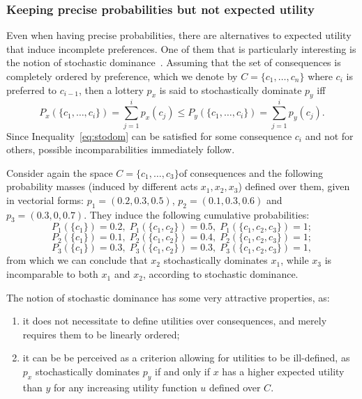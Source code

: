 \documentclass[french, english]{llncs}
\begin{document}
	\subsubsection{Keeping precise probabilities but not expected utility}
	
	Even when having precise probabilities, there are alternatives to expected utility that induce incomplete preferences. One of them that is particularly interesting is the notion of stochastic dominance~\cite{levy_stochastic_1992}. Assuming that the set of consequences is completely ordered by preference, which we denote by $C = \{c_1, …, c_n\}$ where $c_i$ is preferred to $c_{i - 1}$, then a lottery $p_x$ is said to stochastically dominate $p_y$ iff
	\begin{equation}\label{eq:stodom}P_x(\{c_1,\ldots,c_i\})=\sum_{j=1}^i p_x(c_j) \leq P_y(\{c_1,\ldots,c_i\})=\sum_{j=1}^i p_y(c_j).\end{equation}
	Since Inequality~\eqref{eq:stodom} can be satisfied for some consequence $c_i$ and not for others, possible incomparabilities immediately follow. %
	
	\begin{example}
		Consider again the space $C=\{c_1,\ldots,c_3\}$of consequences and the following probability masses (induced by different acts $x_1,x_2,x_3$) defined over them, given in vectorial forms: $p_1=(0.2,0.3,0.5)$, $p_2=(0.1,0.3,0.6)$ and $p_3=(0.3,0,0.7)$. They induce the following cumulative probabilities:
		$$P_1(\{c_1\})=0.2, \; P_1(\{c_1,c_2\})=0.5, \; P_1(\{c_1,c_2,c_3\})=1; $$
		$$P_2(\{c_1\})=0.1, \; P_2(\{c_1,c_2\})=0.4, \; P_2(\{c_1,c_2,c_3\})=1;$$
		$$P_3(\{c_1\})=0.3, \; P_3(\{c_1,c_2\})=0.3, \; P_3(\{c_1,c_2,c_3\})=1, $$
		from which we can conclude that $x_2$ stochastically dominates $x_1$, while $x_3$ is incomparable to both $x_1$ and $x_2$, according to stochastic dominance.
	\end{example}
	
	The notion of stochastic dominance has some very attractive properties, as:
	\begin{enumerate}
		\item it does not necessitate to define utilities over consequences, and merely requires them to be linearly ordered;
		\item it can be be perceived as a criterion allowing for utilities to be ill-defined, as $p_x$ stochastically dominates $p_y$ if and only if $x$ has a higher expected utility than $y$ for any increasing utility function $u$ defined over $C$. 
	\end{enumerate}
	
\end{document}
